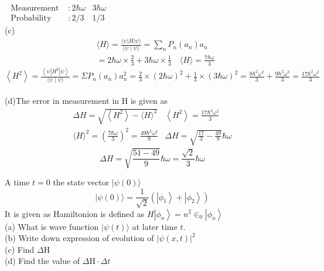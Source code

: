 \begin{enumerate}
\begin{answer}
	$\begin{array}{lll}
		\text { Measurement } & : 2 \hbar \omega & 3 \hbar \omega \\
		\text { Probability } & : 2 / 3 & 1 / 3
	\end{array}$\\
	(c)\begin{align*}
		&\langle H\rangle=\frac{\langle\psi|H| \psi\rangle}{\langle\psi \mid \psi\rangle}=\sum_{n} P_{n}\left(a_{n}\right) a_{n} \\
		&=2 \hbar \omega \times \frac{2}{3}+3 \hbar \omega \times \frac{1}{3} \quad\langle H\rangle=\frac{7 \hbar \omega}{3}
	\end{align*}
	$\left\langle H^{2}\right\rangle=\frac{\left\langle\psi\left|H^{2}\right| \psi\right\rangle}{\langle\psi \mid \psi\rangle}=\Sigma P_{n}\left(a_{n}\right) a_{n}^{2}=\frac{2}{3} \times(2 \hbar \omega)^{2}+\frac{1}{3} \times(3 \hbar \omega)^{2}=\frac{8 \hbar^{2} \omega^{2}}{3}+\frac{9 \hbar^{2} \omega^{2}}{3}=\frac{17 \hbar^{2} \omega^{2}}{3}$\\\\
	(d)The error in measurement in $\mathrm{H}$ is given as
	$$
	\begin{array}{ll}
	\Delta H=\sqrt{\left\langle H^{2}\right\rangle-\langle H\rangle^{2}} & \left\langle H^{2}\right\rangle=\frac{17 \hbar^{2} \omega^{2}}{3} \\
	\langle H\rangle^{2}=\left(\frac{7 \hbar \omega}{3}\right)^{2}=\frac{49 \hbar^{2} \omega^{2}}{9} & \Delta H=\sqrt{\frac{17}{3}-\frac{49}{9}} \hbar \omega
	\end{array}
	$$
	$$
	\Delta H=\sqrt{\frac{51-49}{9}} \hbar \omega=\frac{\sqrt{2}}{3} \hbar \omega
	$$
\end{answer}
	\begin{minipage}{\textwidth}
	\item  A time $t=0$ the state vector $|\psi(0)\rangle$
	$$
	|\psi(0)\rangle=\frac{1}{\sqrt{2}}\left(\left|\phi_{1}\right\rangle+\left|\phi_{2}\right\rangle\right)
	$$
	It is given as Hamiltonion is defined as $H\left|\phi_{n}\right\rangle=n^{2} \in_{0}\left|\phi_{n}\right\rangle$\\
	(a) What is wave function $|\psi(t)\rangle$ at later time $t$.\\
	(b) Write down expression of evolution of $|\psi(x, t)|^{2}$\\
	(c) Find $\Delta \mathrm{H}$\\
	(d) Find the value of $\Delta \mathrm{H} \cdot \Delta t$
\end{minipage}

\end{enumerate}

